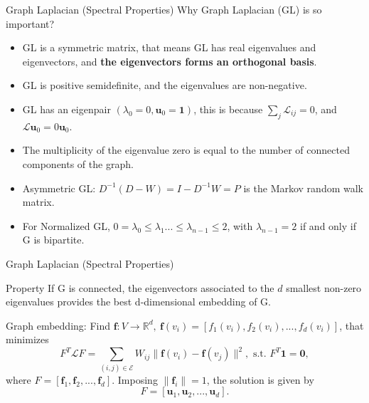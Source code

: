 \documentclass{beamer}
\begin{document}
	\begin{frame}{Graph Laplacian (Spectral Properties)}
		Why Graph Laplacian (GL) is so important?
		\begin{itemize}
			\item GL is a symmetric matrix, that means GL has real eigenvalues and eigenvectors, and \textbf{the eigenvectors forms an orthogonal basis}.
			\item GL is positive semidefinite, and the eigenvalues are non-negative.
			\item GL has an eigenpair $(\lambda_0 = 0, \textbf{u}_0 = \textbf{1})$, this is because $\sum_{j} \mathcal{L}_{ij} = 0$, and $\mathcal{L}\textbf{u}_0 = 0\textbf{u}_0$.
			\item The multiplicity of the eigenvalue zero is equal to the number of connected components of the graph.
			\item Asymmetric GL: $D^{-1}(D-W) = I-D^{-1}W = P$ is the Markov random walk matrix.
			\item For Normalized GL, $0=\lambda_0\leq \lambda_1 ... \leq \lambda_{n-1} \leq 2$, with $\lambda_{n-1}=2$ if and only if G is bipartite.
		\end{itemize}
	\end{frame}
	\begin{frame}{Graph Laplacian (Spectral Properties)}
		\begin{block}{Property}
			If G is connected, the eigenvectors associated to the $d$ smallest non-zero eigenvalues provides the best d-dimensional embedding of G.
		\end{block}
		Graph embedding:
		\newline\newline
		Find $\textbf{f}: V \rightarrow \mathbb{R}^d,\ \textbf{f}(v_i) = [f_1(v_i), f_2(v_i), ..., f_d(v_i)]$, that minimizes
		\[
		F^T\mathcal{L}F = \sum_{(i,j)\in\mathcal{E}}W_{ij}\lVert\textbf{f}(v_i)-\textbf{f}(v_j)\lVert^2,\text{ s.t. } F^T\textbf{1} = \textbf{0},
		\]
		where $F=[\textbf{f}_1, \textbf{f}_2, ..., \textbf{f}_d]$.
		Imposing $\lVert \textbf{f}_i\lVert=1$, the solution is given by
		\[
		F=[\textbf{u}_1, \textbf{u}_2,...,\textbf{u}_d].
		\]
	\end{frame}
	
\end{document}
